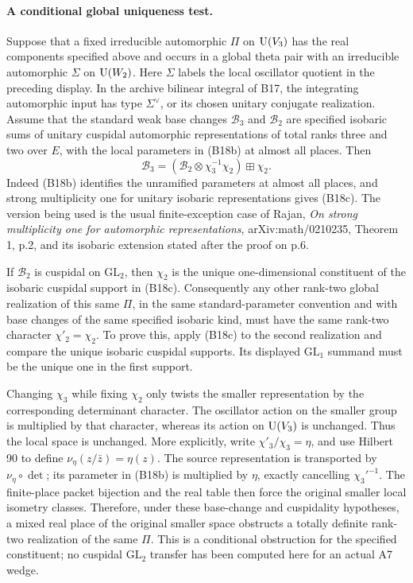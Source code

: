 \documentclass[11pt]{article}
\theoremstyle{definition}\newtheorem{definition}[theorem]{Definition}\newtheorem{remark}[theorem]{Remark}
\begin{document}
\paragraph{A conditional global uniqueness test.}
Suppose that a fixed irreducible automorphic $\Pi$ on $\operatorname{U}(V_3)$
has the real components specified above and occurs in a global
theta pair with an irreducible automorphic $\Sigma$ on $\operatorname{U}(W_2)$.
Here $\Sigma$ labels the local oscillator quotient in the
preceding display. In the archive bilinear integral of B17, the
integrating automorphic input has type $\Sigma^\vee$, or its
chosen unitary conjugate realization. Assume that the standard
weak base changes $\mathcal B_3$ and $\mathcal B_2$ are specified isobaric
sums of unitary cuspidal automorphic representations of total
ranks three and two over $E$, with the local parameters in (B18b)
at almost all places. Then
\[
 \mathcal B_3=
   (\mathcal B_2\otimes\chi_3^{-1}\chi_2)\boxplus\chi_2.
 \tag{B18c}
\]
Indeed (B18b) identifies the unramified parameters at almost all
places, and strong multiplicity one for unitary isobaric
representations gives (B18c). The version being used is the
usual finite-exception case of Rajan, \emph{On strong
multiplicity one for automorphic representations},
arXiv:math/0210235, Theorem 1, p.2, and its isobaric extension
stated after the proof on p.6.

If $\mathcal B_2$ is cuspidal on $\mathrm{GL}_2$, then
$\chi_2$ is the unique one-dimensional constituent of the
isobaric cuspidal support in (B18c). Consequently any other
rank-two global realization of this same $\Pi$, in the same
standard-parameter convention and with base changes of the
same specified isobaric kind, must have the same rank-two character
$\chi'_2=\chi_2$. To prove this, apply (B18c) to the second
realization and compare the unique isobaric cuspidal supports.
Its displayed $\mathrm{GL}_1$ summand must be the unique one
in the first support.

Changing $\chi_3$ while fixing $\chi_2$ only twists the smaller
representation by the corresponding determinant character.
The oscillator action on the smaller group is multiplied by
that character, whereas its action on $\operatorname{U}(V_3)$ is unchanged.
Thus the local space is unchanged. More explicitly, write
$\chi'_3/\chi_3=\eta$, and use Hilbert 90 to define
$\nu_\eta(z/\bar z)=\eta(z)$. The source representation is
transported by $\nu_\eta\circ\det$; its parameter in (B18b)
is multiplied by $\eta$, exactly cancelling $\chi_3'^{-1}$.
The finite-place packet bijection and the real table then
force the original smaller local isometry classes.
Therefore, under these base-change and cuspidality hypotheses,
a mixed real place of the original smaller space obstructs a
totally definite rank-two realization of the same $\Pi$.
This is a conditional obstruction for the specified constituent;
no cuspidal $\mathrm{GL}_2$ transfer has been computed here for
an actual A7 wedge.
\end{document}

